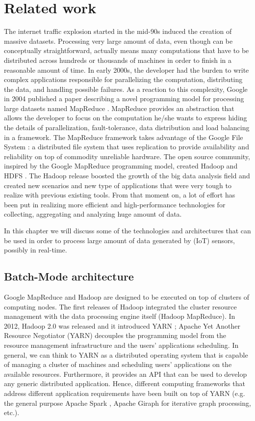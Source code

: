 \chapter{Related work}
The internet traffic explosion started in the mid-90s induced the creation of massive datasets. Processing very large amount of data, even though can be conceptually straightforward, actually means many computations that have to be distributed across hundreds or thousands of machines in order to finish in a reasonable amount of time. In early 2000s, the developer had the burden to write complex applications responsible for parallelizing the computation, distributing the data, and handling possible failures. As a reaction to this complexity, Google in 2004 published a paper describing a novel programming model for processing large datasets named MapReduce \cite{googlemapreduce}. MapReduce provides an abstraction that allows the developer to focus on the computation he/she wants to express hiding the details of parallelization, fault-tolerance, data distribution and load balancing in a framework. The MapReduce framework takes advantage of the Google File System \cite{googlefilesystem}: a distributed file system that uses replication to provide availability and reliability on top of commodity unreliable hardware. The open source community, inspired by the Google MapReduce programming model, created Hadoop \cite{hadooponline} and HDFS \cite{hadoophdfs}. The Hadoop release boosted the growth of the big data analysis field and created new scenarios and new type of applications that were very tough to realize with previous existing tools. From that moment on, a lot of effort has been put in realizing more efficient and high-performance technologies for collecting, aggregating and analyzing huge amount of data.

In this chapter we will discuss some of the technologies and architectures that can be used in order to process large amount of data generated by (IoT) sensors, possibly in real-time.

\section{Batch-Mode architecture}
Google MapReduce and Hadoop are designed to be executed on top of clusters of computing nodes. The first releases of Hadoop integrated the cluster resource management with the data processing engine itself (Hadoop MapReduce). In 2012, Hadoop 2.0 was released \cite{hadooponline} and it introduced YARN \cite{yarn}; Apache Yet Another Resource Negotiator (YARN) decouples the programming model from the resource management infrastructure and the users' applications scheduling. In general, we can think to YARN as a distributed operating system that is capable of managing a cluster of machines and scheduling users' applications on the available resources. Furthermore, it provides an API that can be used to develop any generic distributed application. Hence, different computing frameworks that address different application requirements have been built on top of YARN (e.g. the general purpose Apache Spark \cite{apachesparkonline}, Apache Giraph \cite{apachegiraphonline} for iterative graph processing, etc.). 

